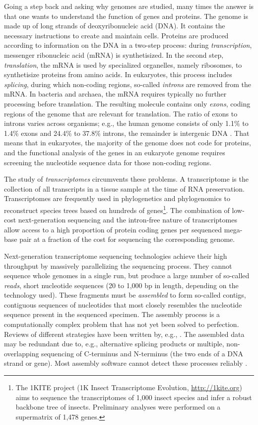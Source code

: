 Going a step back and asking why genomes are studied, many times the answer is
that one wants to understand the function of genes and proteins. The genome is
made up of long strands of deoxyribonucleic acid (DNA). It contains the
necessary instructions to create and maintain cells.  Proteins are produced
according to information on the DNA in a two-step process: during
\emph{transcription}, messenger ribonucleic acid (mRNA) is synthetisized. In the
second step, \emph{translation}, the mRNA is used by specialized organelles,
namely ribosomes, to synthetisize proteins from amino acids. In eukaryotes, this
process includes \emph{splicing}, during which non-coding regions, so-called
\emph{introns} are removed from the mRNA. In bacteria and archaea, the mRNA
requires typically no further processing before translation. The resulting
molecule contains only \emph{exons}, coding regions of the genome that are
relevant for translation. The ratio of exons to introns varies across organisms;
e.g., the human genome consists of only 1.1\% to 1.4\% exons and 24.4\% to
37.8\% introns, the remainder is intergenic DNA \citep{venter2001}. That means
that in eukaryotes, the majority of the genome does not code for proteins, and
the functional analysis of the genes in an eukaryote genome requires screening
the nucleotide sequence data for those non-coding regions.

The study of \emph{transcriptomes} circumvents these problems. A transcriptome
is the collection of all transcripts in a tissue sample at the time of RNA
preservation.  Transcriptomes are frequently used in phylogenetics and
phylogenomics to reconstruct species trees based on hundreds of
genes\footnote{The 1KITE project (1K Insect Transcriptome Evolution,
\url{http://1kite.org}) aims to sequence the transcriptomes of 1,000 insect
species and infer a robust backbone tree of insects. Preliminary analyses were
performed on a supermatrix of 1,478 genes.}.  The combination of low-cost
next-generation sequencing and the intron-free nature of transcriptomes allow
access to a high proportion of protein coding genes per sequenced mega-base pair
at a fraction of the cost for sequencing the corresponding genome.

Next-generation transcriptome sequencing technologies achieve their high
throughput by massively parallelizing the sequencing process. They cannot
sequence whole genomes in a single run, but produce a large number of so-called
\emph{reads}, short nucleotide sequences (20 to 1,000 bp in length, depending on
the technology used). These fragments must be \emph{assembled} to form so-called
contigs, contiguous sequences of nucleotides that most closely resembles the
nucleotide sequence present in the sequenced specimen. The assembly process is a
computationally complex problem that has not yet been solved to perfection.
Reviews of different strategies have been written by, e.g., \citet{zhang2011}.
The assembled data may be redundant due to, e.g., alternative splicing products
\citep{black2003} or multiple, non-overlapping sequencing of C-terminus and
N-terminus (the two ends of a DNA strand or gene). Most assembly software cannot
detect these processes reliably \citep{haiminen2011}. 

